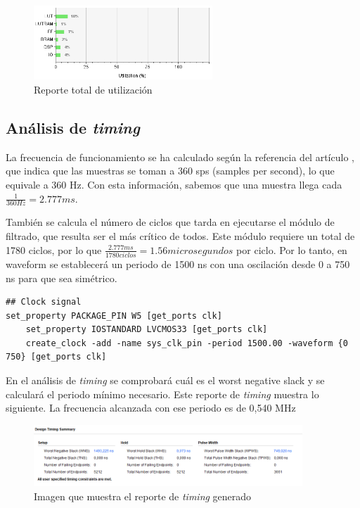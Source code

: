 \begin{figure}[h]
	\centering
	\includegraphics[width=0.6\textwidth]{./Images/img_res_experimentales/utilization3.png}
	\caption{Reporte total de utilización}
	\label{fig:utilization3}
\end{figure}


\subsection{Análisis de  \textit{timing} }

La frecuencia de funcionamiento se ha calculado según la referencia del artículo \cite{desai2021low}, que indica que las muestras se toman a 360 sps (samples per second), lo que equivale a 360 Hz. Con esta información, sabemos que una muestra llega cada \( \frac{1}{360 Hz} = 2.777 ms\).

También se calcula el número de ciclos que tarda en ejecutarse el módulo de filtrado, que resulta ser el más crítico de todos. Este módulo requiere un total de 1780 ciclos, por lo que \( \frac{2.777  ms}{1780 ciclos} = 1.56  microsegundos \) por ciclo. Por lo tanto, en waveform se establecerá un periodo de 1500 ns con una oscilación desde 0 a 750 ns para que sea simétrico.


\lstset{language=VHDL, breaklines=true, basicstyle=\footnotesize}
\begin{lstlisting}[frame=single]
## Clock signal
set_property PACKAGE_PIN W5 [get_ports clk]							
	set_property IOSTANDARD LVCMOS33 [get_ports clk]
	create_clock -add -name sys_clk_pin -period 1500.00 -waveform {0 750} [get_ports clk]
\end{lstlisting}

	En el análisis de  \textit{timing}  se comprobará cuál es el worst negative slack y se calculará el periodo mínimo necesario. Este reporte de  \textit{timing}  muestra lo siguiente. La frecuencia alcanzada con ese periodo es de 0,540 MHz

	\begin{figure}[h!]
		\centering
		\includegraphics[width=0.9\textwidth]{./Images/img_res_experimentales/reportetiming.png}
		\caption{Imagen que muestra el reporte de  \textit{timing}  generado}
		\label{fig:reporteTiming}
	\end{figure} 

